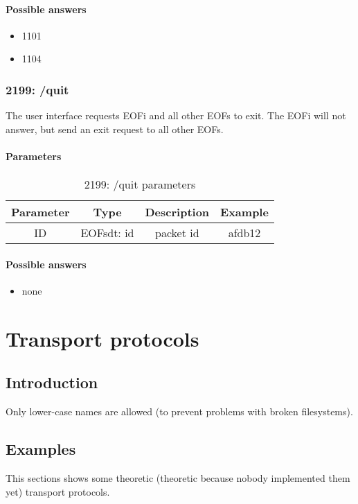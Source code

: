 \documentclass[12pt,a4paper]{book}
\begin{document}
\subsubsection{Possible answers}
\begin{itemize}
\item 1101
\item 1104
\end{itemize}
\subsection{2199: /quit}
The user interface requests EOFi and all other EOFs to exit.
The EOFi will not answer, but send an exit request to all other
EOFs.

\subsubsection{Parameters}
\begin{longtable}{|c|c|c|c|}
\caption{2199: /quit parameters}\\
\hline
\textbf{Parameter} & \textbf{Type} & \textbf{Description} & \textbf{Example}\\
\hline
ID & EOFsdt: id & packet id & afdb12\\
\hline
\end{longtable}

\subsubsection{Possible answers}
\begin{itemize}
\item none
\end{itemize}
\chapter{Transport protocols}
\section{Introduction}
Only lower-case names are allowed (to prevent problems with broken filesystems).
\section{Examples}
This sections shows some theoretic (theoretic because nobody implemented
them yet) transport protocols.
\end{document}
